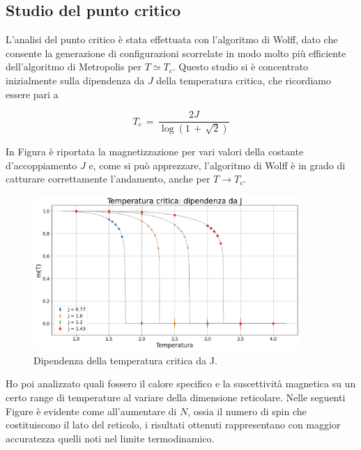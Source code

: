 \subsection{Studio del punto critico}

L'analisi del punto critico è stata effettuata con l'algoritmo di Wolff, dato che consente la generazione di configurazioni 
scorrelate in modo molto più efficiente dell'algoritmo di Metropolis per $T \simeq T_c$. Questo studio si è concentrato inizialmente 
sulla dipendenza da $J$ della temperatura critica, che ricordiamo essere pari a

\begin{equation*}
    T_c\,=\,\frac{2J}{\log{\left(1\,+\,\sqrt{2}\right)}}
\end{equation*}

In Figura è riportata la magnetizzazione per vari valori della costante d'accoppiamento $J$ e, come si può apprezzare, 
l'algoritmo di Wolff è in grado di catturare correttamente l'andamento, anche per $T \to T_c$.

\begin{figure}[H]
    \centering
    \includegraphics[width=0.9\textwidth]{Immagini/simIsing2D/dipTc.png}
    \caption{Dipendenza della temperatura critica da J.}
    \label{fig: Tc_Ising2D}
\end{figure}

Ho poi analizzato quali fossero il calore specifico e la suscettività magnetica su un certo range di temperature al variare 
della dimensione reticolare. Nelle seguenti Figure è evidente come all'aumentare di $N$, ossia il numero di spin che costituiscono 
il lato del reticolo, i risultati ottenuti rappresentano con maggior accuratezza quelli noti nel limite termodinamico.

